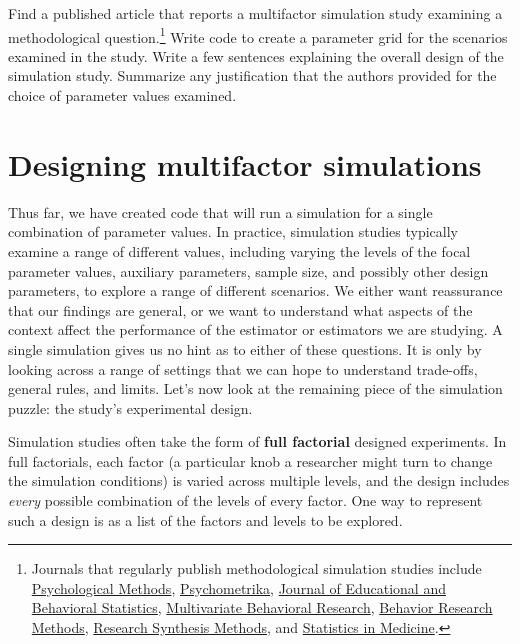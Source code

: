 \documentclass[
]{book}
\begin{document}
Find a published article that reports a multifactor simulation study examining a methodological question.\footnote{Journals that regularly publish methodological simulation studies include \href{https://www.apa.org/pubs/journals/met}{Psychological Methods}, \href{https://link-springer-com.ezproxy.library.wisc.edu/journal/11336}{Psychometrika}, \href{https://journals-sagepub-com.ezproxy.library.wisc.edu/home/jeb}{Journal of Educational and Behavioral Statistics}, \href{https://www-tandfonline-com.ezproxy.library.wisc.edu/journals/hmbr20}{Multivariate Behavioral Research}, \href{https://link.springer.com/journal/13428}{Behavior Research Methods}, \href{https://www.cambridge.org/core/journals/research-synthesis-methods}{Research Synthesis Methods}, and \href{https://onlinelibrary-wiley-com.ezproxy.library.wisc.edu/journal/10970258}{Statistics in Medicine}.}
Write code to create a parameter grid for the scenarios examined in the study.
Write a few sentences explaining the overall design of the simulation study.
Summarize any justification that the authors provided for the choice of parameter values examined.

\chapter{Designing multifactor simulations}\label{designing-multifactor-simulations}

Thus far, we have created code that will run a simulation for a single combination of parameter values.
In practice, simulation studies typically examine a range of different values, including varying the levels of the focal parameter values, auxiliary parameters, sample size, and possibly other design parameters, to explore a range of different scenarios.
We either want reassurance that our findings are general, or we want to understand what aspects of the context affect the performance of the estimator or estimators we are studying.
A single simulation gives us no hint as to either of these questions.
It is only by looking across a range of settings that we can hope to understand trade-offs, general rules, and limits.
Let's now look at the remaining piece of the simulation puzzle: the study's experimental design.

Simulation studies often take the form of \textbf{full factorial} designed experiments.
In full factorials, each factor (a particular knob a researcher might turn to change the simulation conditions) is varied across multiple levels, and the design includes \emph{every} possible combination of the levels of every factor. One way to represent such a design is as a list of the factors and levels to be explored.
\end{document}
